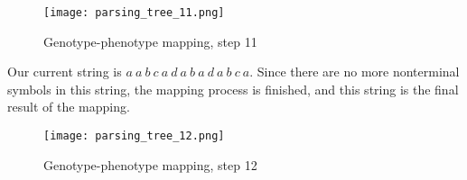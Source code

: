 \begin{figure}[H]
	\centering
	\texttt{[image: parsing\_tree\_11.png]}
	\caption{Genotype-phenotype mapping, step 11}
\end{figure}

Our current string is $a\:a\:b\:c\:a\:d\:a\:b\:a\:d\:a\:b\:c\:a$. Since there are no more nonterminal symbols in this string, the mapping process is finished, and this string is the final result of the mapping.

\begin{figure}[H]
	\centering
	\texttt{[image: parsing\_tree\_12.png]}
	\caption{Genotype-phenotype mapping, step 12}
\end{figure}